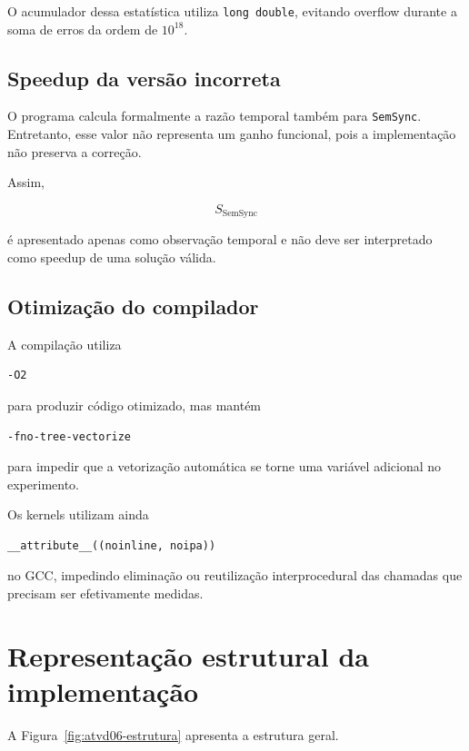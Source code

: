 O acumulador dessa estatística utiliza \texttt{long double}, evitando
overflow durante a soma de erros da ordem de \(10^{18}\).


\subsection{Speedup da versão incorreta}

O programa calcula formalmente a razão temporal também para
\texttt{SemSync}. Entretanto, esse valor não representa um ganho funcional,
pois a implementação não preserva a correção.

Assim,

\begin{equation}
    S_{\text{SemSync}}
\end{equation}

é apresentado apenas como observação temporal e não deve ser interpretado
como speedup de uma solução válida.


\subsection{Otimização do compilador}

A compilação utiliza

\begin{verbatim}
-O2
\end{verbatim}

para produzir código otimizado, mas mantém

\begin{verbatim}
-fno-tree-vectorize
\end{verbatim}

para impedir que a vetorização automática se torne uma variável adicional
no experimento.

Os kernels utilizam ainda

\begin{verbatim}
__attribute__((noinline, noipa))
\end{verbatim}

no GCC, impedindo eliminação ou reutilização interprocedural das chamadas
que precisam ser efetivamente medidas.


\section{Representação estrutural da implementação}

\label{sec:atvd06-estrutura}

A Figura~\ref{fig:atvd06-estrutura} apresenta a estrutura geral.

